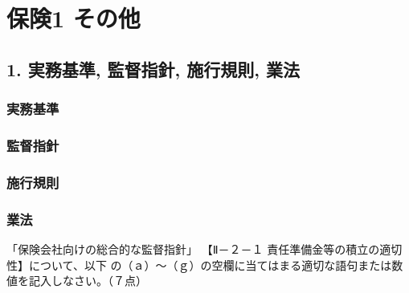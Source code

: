 \documentclass[report,gutter=10mm,fore-edge=10mm,uplatex,dvipdfmx]{jlreq}
\begin{document}
\chapter{保険1 その他}
\section{1.   実務基準, 監督指針, 施行規則, 業法}

\subsection{実務基準}

\subsection{監督指針}

\subsection{施行規則}

\subsection{業法}


「保険会社向けの総合的な監督指針」
【Ⅱ－２－１ 責任準備金等の積立の適切性】について、以下
の（ａ）～（ｇ）の空欄に当てはまる適切な語句または数値を記入しなさい。（７点）
\end{document}
